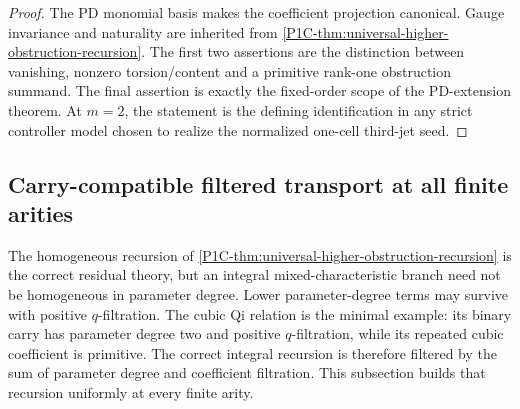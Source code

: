 \documentclass[11pt]{article}
\theoremstyle{remark}
\begin{document}
\begin{proof}
The PD monomial basis makes the coefficient projection canonical.  Gauge invariance and naturality are inherited from \cref{P1C-thm:universal-higher-obstruction-recursion}.  The first two assertions are the distinction between vanishing, nonzero torsion/content and a primitive rank-one obstruction summand.  The final assertion is exactly the fixed-order scope of the PD-extension theorem.  At $m=2$, the statement is the defining identification in any strict controller model chosen to realize the normalized one-cell third-jet seed.
\end{proof}



\subsection{Carry-compatible filtered transport at all finite arities}\label{P1C-subsec:carry-compatible-recursion}

The homogeneous recursion of \cref{P1C-thm:universal-higher-obstruction-recursion} is the correct
residual theory, but an integral mixed-characteristic branch need not be homogeneous in parameter
degree.  Lower parameter-degree terms may survive with positive $q$-filtration.  The cubic Qi
relation is the minimal example: its binary carry has parameter degree two and positive
$q$-filtration, while its repeated cubic coefficient is primitive.  The correct integral recursion is
therefore filtered by the sum of parameter degree and coefficient filtration.  This subsection builds
that recursion uniformly at every finite arity.
\end{document}

